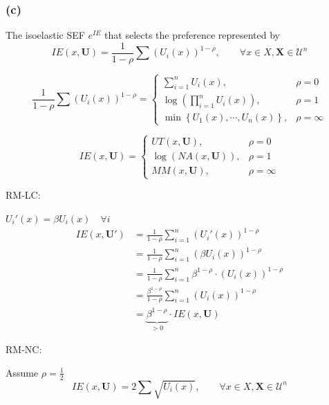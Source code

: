 \documentclass[a4paper]{article}
\begin{document}
\subsubsection*{(c)}

The isoelastic SEF $e^{IE}$ that selects the preference represented by
\[IE(x,\mathbf{U})=\frac{1}{1-\rho}\sum\left(U_i(x) \right)^{1-\rho},\qquad\forall x\in X,\mathbf{X}\in\mathscr{U}^{n} \]

\begin{equation*}
    \frac{1}{1-\rho}\sum\left(U_i(x) \right)^{1-\rho}=
    \begin{cases}
        \sum_{i=1}^{n}U_i(x), & \rho=0 \\
        \log \left(\prod_{i=1}^{n} U_i(x) \right), & \rho=1 \\
        \min\left\{U_1(x),\cdots, U_n(x) \right\}, & \rho=\infty
    \end{cases}
\end{equation*}

\begin{equation*}
    IE(x,\mathbf{U})=
    \begin{cases}
        UT(x,\mathbf{U}), & \rho=0 \\
        \log \left(NA(x,\mathbf{U})\right), & \rho=1 \\
        MM(x,\mathbf{U}), & \rho=\infty
    \end{cases}
\end{equation*}

RM-LC:

$U_i'(x)=\beta U_i(x)\quad\forall i$
\begin{align*}
    IE(x, \mathbf{U}') &= \frac{1}{1-\rho}\sum_{i=1}^{n}(U_i'(x))^{1-\rho} \\
    &= \frac{1}{1-\rho}\sum_{i=1}^{n}(\beta U_i(x))^{1-\rho}      \\
    &= \frac{1}{1-\rho}\sum_{i=1}^{n}\beta^{1-\rho}\cdot (U_i(x))^{1-\rho} \\
    &= \frac{\beta^{1-\rho}}{1-\rho}\sum_{i=1}^{n}(U_i(x))^{1-\rho} \\
    &= \underbrace{\beta^{1-\rho}}_{>0}\cdot IE(x,\mathbf{U})
\end{align*}


RM-NC:

Assume $\rho=\frac{1}{2}$
\[IE(x,\mathbf{U})=2\sum\sqrt{U_i(x)},\qquad\forall x\in X,\mathbf{X}\in\mathscr{U}^{n} \]
\end{document}
